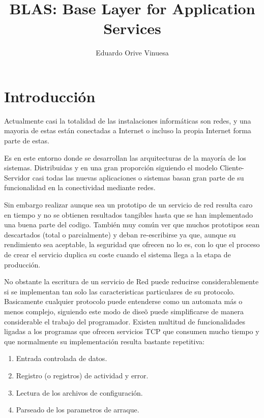 \documentclass[a4paper,spanish,12pt]{book}
\title{BLAS: Base Layer for Application Services}
\author{Eduardo Orive Vinuesa}
\begin{document}
\tableofcontents

\maketitle



\chapter*{Introducción}
Actualmente casi la totalidad de las instalaciones inform\'aticas son redes, y una mayoria de estas est\'an conectadas a Internet o incluso la propia Internet forma parte de estas. 

Es en este entorno donde se desarrollan las arquitecturas de la mayor\'ia de los sistemas. Distribuidas y en una gran proporci\'on siguiendo el modelo Cliente-Servidor casi todas las nuevas aplicaciones o sistemas basan gran parte de su funcionalidad en la conectividad mediante redes. 

Sin embargo realizar aunque sea un prototipo de un servicio de red resulta caro en tiempo y no se obtienen resultados tangibles hasta que se han implementado una buena parte del codigo.
Tambi\'en muy com\'un ver que muchos prototipos sean descartados (total o parcialmente) y deban re-escribirse ya que, aunque su rendimiento sea aceptable, la seguridad que ofrecen no lo es, con lo que el proceso de crear el servicio duplica su coste cuando el sistema llega a la etapa de producci\'on.

No obstante la escritura de un servicio de Red puede reducirse considerablemente si se implementan tan solo las caracteristicas particulares de su protocolo. Basicamente cualquier protocolo puede entenderse como un automata m\'as o menos complejo, siguiendo este modo de dise\~{o} puede simplificarse de manera considerable el trabajo del programador.
Existen multitud de funcionalidades ligadas a los programas que ofrecen servicios TCP que consumen mucho tiempo y que normalmente su implementaci\'on resulta bastante repetitiva:
\begin{enumerate}
\item Entrada controlada de datos.
\item Registro (o registros) de actividad y error.
\item Lectura de los archivos de configuraci\'on.
\item Parseado de los parametros de arraque.
\end{enumerate}
\end{document}
